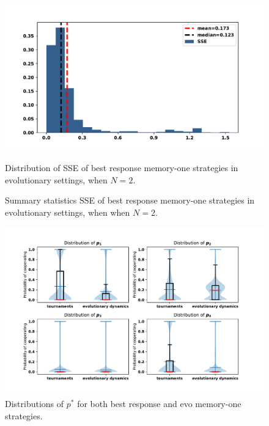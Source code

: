 \begin{figure}[!htbp]
    \begin{minipage}{0.72\textwidth}
            \begin{center}
            \includegraphics[width=\linewidth]{src/chapters/chapters-05/paper/Memory-size-in-the-prisoners-dilemma/img/evo_sserror.pdf}
            \end{center}
            \caption{Distribution of SSE of best response memory-one strategies in
            evolutionary settings, when \(N=2\).}
            \label{fig:sserror_mem_one}
    \end{minipage}\hspace{1cm}
    \begin{minipage}{0.21\textwidth}
        \centering
        \captionsetup{type=table}
        \resizebox{.85\columnwidth}{!}{%
            }
            \caption{Summary statistics SSE of best response memory-one strategies in
            evolutionary settings, when when \(N=2\).}
            \label{table:sserror_stats}
      \end{minipage}
\end{figure}

\begin{figure}[!htbp]
    \centering
    \includegraphics[width=.8\textwidth]{src/chapters/chapters-05/paper/Memory-size-in-the-prisoners-dilemma/img/behaviour_violin_plots.pdf}
    \caption{Distributions of \(p^*\) for both best response and evo memory-one
    strategies.}
    \label{fig:behaviour_violin_plots}
\end{figure}

